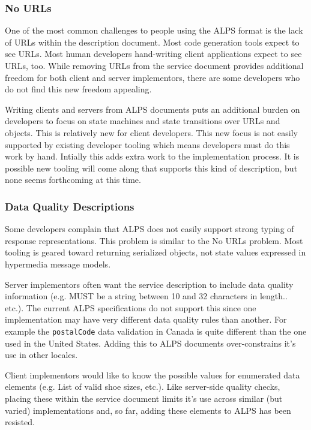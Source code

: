 \documentclass{wsrest2014}
\begin{document}
\subsubsection{No URLs}
\label{_no_urls}
 \par{}One of the most common challenges to people using the ALPS format is the lack of URLs within the description document. Most code generation tools expect to see URLs. Most human developers hand-writing client applications expect to see URLs, too. While removing URLs from the service document provides additional freedom for both client and server implementors, there are some developers who do not find this new freedom appealing.
 \par{}Writing clients and servers from ALPS documents puts an additional burden on developers to focus on state machines and state transitions over URLs and objects. This is relatively new for client developers. This new focus is not easily supported by existing developer tooling which means developers must do this work by hand. Intially this adds extra work to the implementation process. It is possible new tooling will come along that supports this kind of description, but none seems forthcoming at this time.
\hypertarget{_data_quality_descriptions}{}
\subsubsection{Data Quality Descriptions}
\label{_data_quality_descriptions}
 \par{}Some developers complain that ALPS does not easily support strong typing of response representations. This problem is similar to the \textquotedbl{}No URLs\textquotedbl{} problem. Most tooling is geared toward returning serialized objects, not state values expressed in hypermedia message models.
 \par{}Server implementors often want the service description to include data quality information (e.g. \textquotedbl{}MUST be a string between 10 and 32 characters in length.\textquotedbl{}. etc.). The current ALPS specifications do not support this since one implementation may have very different data quality rules than another. For example the \texttt{postalCode} data validation in Canada is quite different than the one used in the United States. Adding this to ALPS documents over-constrains it's use in other locales.
 \par{}Client implementors would like to know the possible values for enumerated data elements (e.g. \textquotedbl{}List of valid shoe sizes\textquotedbl{}, etc.). Like server-side quality checks, placing these within the service document limits it's use across similar (but varied) implementations and, so far, adding these elements to ALPS has been resisted.
\hypertarget{_test_driven_development_support}{}
\end{document}
